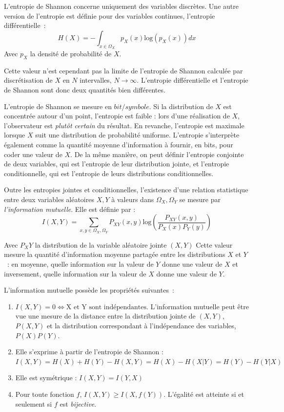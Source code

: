 \documentclass[../main]{subfiles}
\begin{document}
L'entropie de Shannon concerne uniquement des variables discrètes.
Une autre version de l'entropie est définie pour des variables continues, l'entropie différentielle~:
\begin{equation}
    H(X) = - \int_{x \in \Omega_X}{p_X(x)\textrm{log}(p_X(x))dx}
\end{equation}
Avec $p_X$ la densité de probabilité de $X$.
    
Cette valeur n'est cependant pas la limite de l'entropie de Shannon calculée par discrétisation de $X$ en $N$ intervalles, $N \rightarrow \infty$.
L'entropie différentielle et l'entropie de Shannon sont donc deux quantités bien différentes.

L'entropie de Shannon se mesure en $bit/symbole$.
Si la distribution de $X$ est concentrée autour d'un point, l'entropie est faible : lors d'une réalisation de $X$, l'observateur est \emph{plutôt certain} du résultat. 
En revanche, l'entropie est maximale lorsque $X$ suit une distribution de probabilité uniforme.
L'entropie s'interprète également comme la quantité moyenne d'information à fournir, en bits, pour coder une valeur de $X$.
De la même manière, on peut définir l'entropie conjointe de deux variables, qui est l'entropie de leur distribution jointe, et l'entropie conditionnelle, qui est l'entropie de leurs distributions conditionnelles.

Outre les entropies jointes et conditionnelles, l'existence d'une relation statistique entre deux variables aléatoires $X,Y$ à valeurs dans $\Omega_X,\Omega_Y$ se mesure par \emph{l'information mutuelle}.
Elle est définie par : 
\begin{equation}
 I(X,Y) = \sum_{x,y \in \Omega_X,\Omega_Y}{P_{XY}(x,y)\textrm{log}(\frac{P_{XY}(x,y)}{P_X(x)P_Y(y)})}
\end{equation}

Avec $P_XY$ la distribution de la variable aléatoire jointe $(X,Y)$
Cette valeur mesure la quantité d'information moyenne partagée entre les distributions $X$ et $Y$~: en moyenne, quelle information sur la valeur de $Y$ donne une valeur de $X$ et inversement, quelle information sur la valeur de $X$ donne une valeur de $Y$.

L'information mutuelle possède les propriétés suivantes~:
\begin{enumerate}
\item $I(X,Y) = 0 \Leftrightarrow \textrm{X et Y sont indépendantes}$. L'information mutuelle peut être vue une mesure de la distance entre la distribution jointe de $(X,Y)$, $P(X,Y)$ et la distribution correspondant à l'indépendance des variables, $P(X)P(Y)$.
\item\label{it:h} Elle s'exprime à partir de l'entropie de Shannon : $I(X,Y) = H(X) + H(Y) - H(X,Y) = H(X) - H(X|Y) = H(Y) - H(Y|X)$
\item Elle est symétrique : $I(X,Y) = I(Y,X)$
\item\label{it:eq} Pour toute fonction $f$, $I(X,Y) \geq I(X,f(Y))$. L'égalité est atteinte si et seulement si $f$ est \emph{bijective}.
\end{enumerate}
\end{document}
